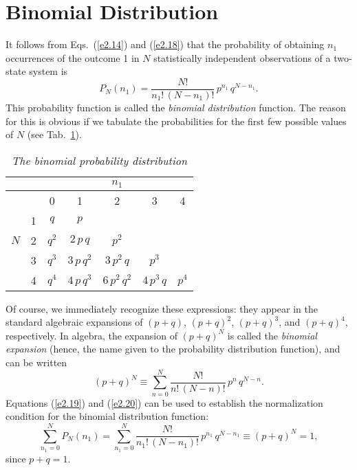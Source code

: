 \section{Binomial Distribution}
It follows from Eqs.~(\ref{e2.14}) and (\ref{e2.18}) that the probability of obtaining
$n_1$ occurrences of the 
outcome 1 in $N$ statistically independent observations of a two-state system
is
\begin{equation}
P_N(n_1) = \frac{N!}{n_1 !\,(N-n_1)!} \,p^{n_1}\,q^{N-n_1}.\label{e2.19}
\end{equation}
This probability function is called the {\em binomial distribution}\/ function.
The reason for this is obvious if we tabulate the probabilities for the
first few possible values of $N$ (see Tab.~\ref{tm1}).
\begin{table}\centering
\begin{tabular}{c|c|ccccc}
    &   &       &         &$n_1$    &        &      \\[0.5ex] \hline
    &   &0      &1        &2        &3       &4     \\[0.5ex] \hline
    &1  &$q$    &$p$      &         &        &      \\[0.5ex] 
$N$ &2  &$q^2$  &$2\,p\,q$    &$p^2$    &        &      \\[0.5ex] 
    &3  &$q^3$  &$3\,p\,q^2$  &$3\,p^2\,q$  &$p^3$   &      \\[0.5ex] 
    &4  &$q^4$  &$4\,p\,q^3$  &$6\,p^2\,q^2$  &$4\,p^3\,q$ &$p^4$ \\[0.5ex] 
\end{tabular}
\caption{\em The binomial probability distribution}\label{tm1}
\end{table}
Of course, we immediately recognize these expressions:
 they appear in the standard
algebraic expansions of $(p+q)$, $(p+q)^2$, $(p+q)^3$, and $(p+q)^4$,
respectively. In algebra, the expansion of $(p+q)^N$ is called the
{\em binomial expansion}\/ (hence, the name given to the probability distribution
function),
and can be written
\begin{equation}
(p+q)^N \equiv \sum_{n=0}^{N} \frac{N!}{n!\,(N-n)!}\,p^n \,q^{N-n}.\label{e2.20}
\end{equation}
Equations (\ref{e2.19}) and (\ref{e2.20}) can be used to establish the normalization
condition for the binomial distribution function:
\begin{equation}
\sum_{n_1=0}^N P_N(n_1) =\sum_{n_1=0}^N \frac{N!}{n_1!\,(N-n_1)!}\,p^{n_1}\,
q^{N-n_1}\equiv (p+q)^N = 1,
\end{equation}
since $p+q=1$. 

